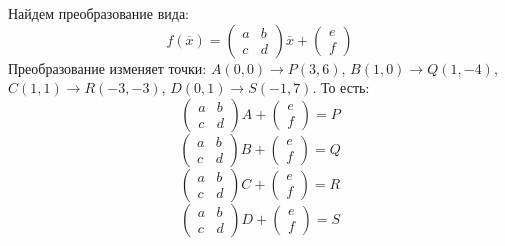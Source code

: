 \documentclass [a4paper,12pt]{article}
\begin{document}
\section{} %
Найдем преобразование вида:
\begin{equation*}
f({\overline{x}})=\begin{pmatrix}
a & b\\
c & d
\end{pmatrix}{\overline{x}} +
\begin{pmatrix}
e\\
f
\end{pmatrix}
\end{equation*}
Преобразование изменяет точки: $A(0,0)\rightarrow P(3,6)$, $B(1,0)\rightarrow Q(1,-4)$,
$C(1,1) \rightarrow R(-3,-3)$, $D(0,1)\rightarrow S(-1,7)$. То есть:\\
\begin{equation*}
\begin{pmatrix}
a & b\\
c & d
\end{pmatrix}A +
\begin{pmatrix}
e\\
f
\end{pmatrix} = P
\end{equation*}
\begin{equation*}
\begin{pmatrix}
a & b\\
c & d
\end{pmatrix}B +
\begin{pmatrix}
e\\
f
\end{pmatrix} = Q
\end{equation*}
\begin{equation*}
\begin{pmatrix}
a & b\\
c & d
\end{pmatrix}C +
\begin{pmatrix}
e\\
f
\end{pmatrix} = R
\end{equation*}
\begin{equation*}
\begin{pmatrix}
a & b\\
c & d
\end{pmatrix}D +
\begin{pmatrix}
e\\
f
\end{pmatrix} = S
\end{equation*}
\end{document}
